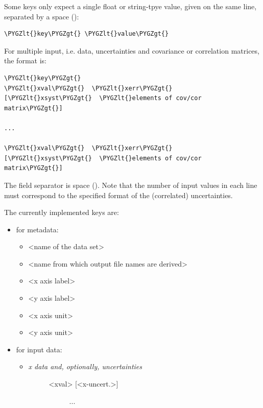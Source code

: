 \documentclass[a4paper,10pt,english]{sphinxmanual}
\def\PYGZlt{\char`\<}
\def\PYGZgt{\char`\>}
\begin{document}
\begin{fulllineitems}
Some keys only expect a single float or string-tpye value, given
on the same line, separated by a space ():

\begin{Verbatim}[commandchars=\\\{\}]
\PYGZlt{}key\PYGZgt{} \PYGZlt{}value\PYGZgt{}
\end{Verbatim}

For multiple input, i.e. data, uncertainties and covariance or
correlation matrices, the format is:

\begin{Verbatim}[commandchars=\\\{\}]
\PYGZlt{}key\PYGZgt{}
\PYGZlt{}xval\PYGZgt{}  \PYGZlt{}xerr\PYGZgt{}  [\PYGZlt{}xsyst\PYGZgt{}  \PYGZlt{}elements of cov/cor matrix\PYGZgt{}]

...

\PYGZlt{}xval\PYGZgt{}  \PYGZlt{}xerr\PYGZgt{}  [\PYGZlt{}xsyst\PYGZgt{}  \PYGZlt{}elements of cov/cor matrix\PYGZgt{}]
\end{Verbatim}

The field separator is space (). Note that the number of input
values in each line must correspond to the specified format of the
(correlated) uncertainties.

The currently implemented keys are:
\begin{itemize}
\item {} 
for metadata:
\begin{itemize}
\item {} 
     \textless{}name of the data set\textgreater{}

\item {} 
  \textless{}name from which output file names are derived\textgreater{}

\item {} 
    \textless{}x axis label\textgreater{}

\item {} 
    \textless{}y axis label\textgreater{}

\item {} 
      \textless{}x axis unit\textgreater{}

\item {} 
      \textless{}y axis unit\textgreater{}

\end{itemize}

\item {} 
for input data:
\begin{itemize}
\item {} \begin{description}
\item[{     \emph{x data and, optionally, uncertainties}}] \leavevmode\begin{description}
\item[{\textless{}xval\textgreater{}  {[}\textless{}x-uncert.\textgreater{}{]}}] \leavevmode
...


\end{description}
\end{description}
\end{itemize}
\end{itemize}
\end{fulllineitems}
\end{document}
